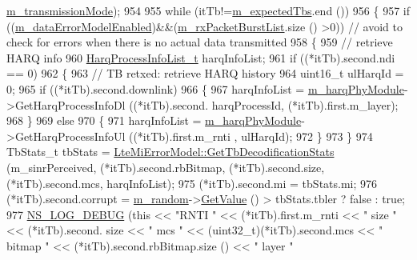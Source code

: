 \begin{DoxyCode}
      \hyperlink{classns3_1_1LteSpectrumPhy_a186ddcdf95b723c9f60a3a026c0df288}{m\_transmissionMode});
954   
955   \textcolor{keywordflow}{while} (itTb!=\hyperlink{classns3_1_1LteSpectrumPhy_a7ac1117604ed722833af5e5538d69251}{m\_expectedTbs}.end ())
956     \{
957       \textcolor{keywordflow}{if} ((\hyperlink{classns3_1_1LteSpectrumPhy_a0e5c57eaf647ff5723780ac9a4a2da18}{m\_dataErrorModelEnabled})&&(\hyperlink{classns3_1_1LteSpectrumPhy_ae74163b2a9dd7db93b172204c833ce4f}{m\_rxPacketBurstList}.size ()
      >0)) \textcolor{comment}{// avoid to check for errors when there is no actual data transmitted}
958         \{
959           \textcolor{comment}{// retrieve HARQ info}
960           \hyperlink{namespacens3_a8e9da9f7a4e5c0954a109b0e1dc36e40}{HarqProcessInfoList\_t} harqInfoList;
961           \textcolor{keywordflow}{if} ((*itTb).second.ndi == 0)
962             \{
963               \textcolor{comment}{// TB retxed: retrieve HARQ history}
964               uint16\_t ulHarqId = 0;
965               \textcolor{keywordflow}{if} ((*itTb).second.downlink)
966                 \{
967                   harqInfoList = \hyperlink{classns3_1_1LteSpectrumPhy_a6febfefe8b9da4a5559c5bb08bf77f26}{m\_harqPhyModule}->GetHarqProcessInfoDl ((*itTb).second.
      harqProcessId, (*itTb).first.m\_layer);
968                 \}
969               \textcolor{keywordflow}{else}
970                 \{
971                   harqInfoList = \hyperlink{classns3_1_1LteSpectrumPhy_a6febfefe8b9da4a5559c5bb08bf77f26}{m\_harqPhyModule}->GetHarqProcessInfoUl ((*itTb).first.m\_rnti
      , ulHarqId);
972                 \}
973             \}
974           TbStats\_t tbStats = \hyperlink{classns3_1_1LteMiErrorModel_a9b4bb57209595fa7100a13de1618b130}{LteMiErrorModel::GetTbDecodificationStats}
       (m\_sinrPerceived, (*itTb).second.rbBitmap, (*itTb).second.size, (*itTb).second.mcs, harqInfoList);
975           (*itTb).second.mi = tbStats.mi;
976           (*itTb).second.corrupt = \hyperlink{classns3_1_1LteSpectrumPhy_affa72b99789e284a3451dbd8efaa7e54}{m\_random}->\hyperlink{classns3_1_1UniformRandomVariable_a03822d8c86ac51e9aa83bbc73041386b}{GetValue} () > tbStats.tbler ? \textcolor{keyword}{false} : \textcolor{keyword}{true};
977           \hyperlink{group__logging_ga413f1886406d49f59a6a0a89b77b4d0a}{NS\_LOG\_DEBUG} (\textcolor{keyword}{this} << \textcolor{stringliteral}{"RNTI "} << (*itTb).first.m\_rnti << \textcolor{stringliteral}{" size "} << (*itTb).second.
      size << \textcolor{stringliteral}{" mcs "} << (uint32\_t)(*itTb).second.mcs << \textcolor{stringliteral}{" bitmap "} << (*itTb).second.rbBitmap.size () << \textcolor{stringliteral}{" layer "}

\end{DoxyCode}
